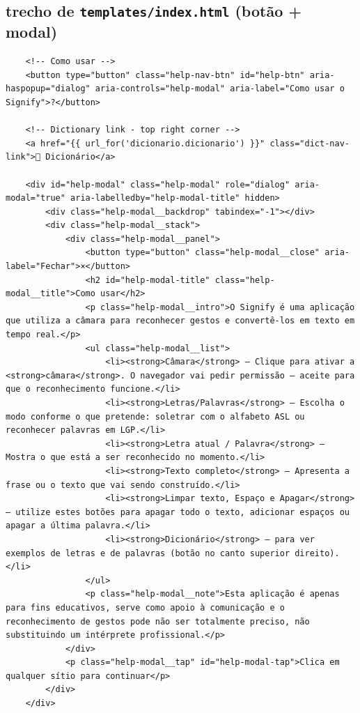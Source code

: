 
\subsection*{trecho de \texttt{templates/index.html} (botão + modal)}
\begin{verbatim}
    <!-- Como usar -->
    <button type="button" class="help-nav-btn" id="help-btn" aria-haspopup="dialog" aria-controls="help-modal" aria-label="Como usar o Signify">?</button>

    <!-- Dictionary link - top right corner -->
    <a href="{{ url_for('dicionario.dicionario') }}" class="dict-nav-link">📓 Dicionário</a>

    <div id="help-modal" class="help-modal" role="dialog" aria-modal="true" aria-labelledby="help-modal-title" hidden>
        <div class="help-modal__backdrop" tabindex="-1"></div>
        <div class="help-modal__stack">
            <div class="help-modal__panel">
                <button type="button" class="help-modal__close" aria-label="Fechar">×</button>
                <h2 id="help-modal-title" class="help-modal__title">Como usar</h2>
                <p class="help-modal__intro">O Signify é uma aplicação que utiliza a câmara para reconhecer gestos e convertê-los em texto em tempo real.</p>
                <ul class="help-modal__list">
                    <li><strong>Câmara</strong> — Clique para ativar a <strong>câmara</strong>. O navegador vai pedir permissão — aceite para que o reconhecimento funcione.</li>
                    <li><strong>Letras/Palavras</strong> — Escolha o modo conforme o que pretende: soletrar com o alfabeto ASL ou reconhecer palavras em LGP.</li>
                    <li><strong>Letra atual / Palavra</strong> — Mostra o que está a ser reconhecido no momento.</li>
                    <li><strong>Texto completo</strong> — Apresenta a frase ou o texto que vai sendo construído.</li>
                    <li><strong>Limpar texto, Espaço e Apagar</strong> — utilize estes botões para apagar todo o texto, adicionar espaços ou apagar a última palavra.</li>
                    <li><strong>Dicionário</strong> — para ver exemplos de letras e de palavras (botão no canto superior direito).</li>
                </ul>
                <p class="help-modal__note">Esta aplicação é apenas para fins educativos, serve como apoio à comunicação e o reconhecimento de gestos pode não ser totalmente preciso, não substituindo um intérprete profissional.</p>
            </div>
            <p class="help-modal__tap" id="help-modal-tap">Clica em qualquer sítio para continuar</p>
        </div>
    </div>
\end{verbatim}

